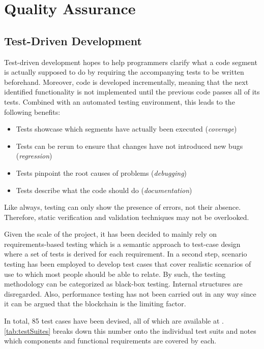 
\chapter{Quality Assurance}
\label{chp:qualityAssurance}

\section{Test-Driven Development}
Test-driven development hopes to help programmers clarify what a code segment is actually supposed to do by requiring the accompanying tests to be written beforehand. Moreover, code is developed incrementally, meaning that the next identified functionality is not implemented until the previous code passes all of its tests. Combined with an automated testing environment, this leads to the following benefits:

\begin{itemize}
  \item Tests showcase which segments have actually been executed (\textit{coverage})
  \item Tests can be rerun to ensure that changes have not introduced new bugs (\textit{regression})
  \item Tests pinpoint the root causes of problems (\textit{debugging})
  \item Tests describe what the code should do (\textit{documentation})
\end{itemize}

Like always, testing can only show the presence of errors, not their absence. Therefore, static verification and validation techniques may not be overlooked.

Given the scale of the project, it has been decided to mainly rely on requirements-based testing which is a semantic approach to test-case design where a set of tests is derived for each requirement. In a second step, scenario testing has been employed to develop test cases that cover realistic scenarios of use to which most people should be able to relate. By such, the testing methodology can be categorized as black-box testing. Internal structures are disregarded. Also, performance testing has not been carried out in any way since it can be argued that the blockchain is the limiting factor.

In total, 85 test cases have been devised, all of which are available at \cite{depositRefundGitHub}. \autoref{tab:testSuites} breaks down this number onto the individual test suits and notes which components and functional requirements are covered by each.

